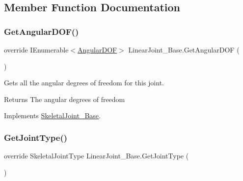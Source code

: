 \subsection{Member Function Documentation}
\mbox{\label{class_linear_joint___base_a4f814a5b27b53d3d01ad39adbcd2b0bf}} 
\subsubsection{\texorpdfstring{Get\+Angular\+D\+O\+F()}{GetAngularDOF()}}
{\footnotesize\ttfamily override I\+Enumerable$<$\hyperlink{interface_angular_d_o_f}{Angular\+D\+OF}$>$ Linear\+Joint\+\_\+\+Base.\+Get\+Angular\+D\+OF (\begin{DoxyParamCaption}{ }\end{DoxyParamCaption})\hspace{0.3cm}{\ttfamily [virtual]}}



Gets all the angular degrees of freedom for this joint. 

\begin{DoxyReturn}{Returns}
The angular degrees of freedom
\end{DoxyReturn}


Implements \hyperlink{class_skeletal_joint___base_abf96267052733ccf001e0b092c6582f8}{Skeletal\+Joint\+\_\+\+Base}.

\mbox{\label{class_linear_joint___base_aa162de1777f1daaa7ca2234fc6a913ab}} 
\subsubsection{\texorpdfstring{Get\+Joint\+Type()}{GetJointType()}}
{\footnotesize\ttfamily override Skeletal\+Joint\+Type Linear\+Joint\+\_\+\+Base.\+Get\+Joint\+Type (\begin{DoxyParamCaption}{ }\end{DoxyParamCaption})\hspace{0.3cm}{\ttfamily [virtual]}}



